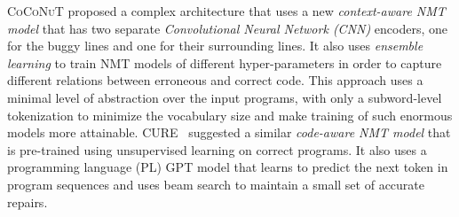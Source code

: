 %
\textsc{CoCoNuT} \citep{Lutellier2020} proposed a complex architecture that uses
a new \emph{context-aware NMT model} that has two separate \emph{Convolutional
Neural Network (CNN)} encoders, one for the buggy lines and one for their
surrounding lines. It also uses \emph{ensemble learning} to train NMT models of
different hyper-parameters in order to capture different relations between
erroneous and correct code. This approach uses a minimal level of abstraction
over the input programs, with only a subword-level tokenization to minimize the
vocabulary size and make training of such enormous models more attainable.
%
\textsc{CURE}~\citep{Jiang_2021} suggested a similar \emph{code-aware NMT model}
that is pre-trained using unsupervised learning on correct programs. It also
uses a programming language (PL) \textsc{GPT} \citep{GPT2020} model that learns
to predict the next token in program sequences and uses beam search to maintain
a small set of accurate repairs.
